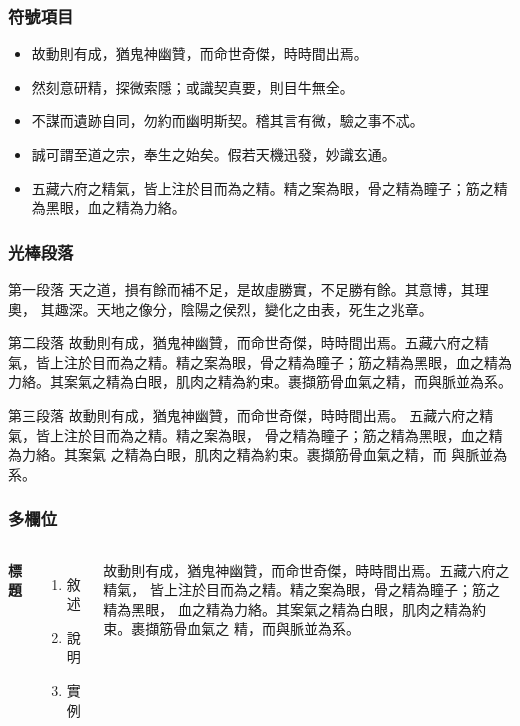 \documentclass[hyperref={bookmarks=false}]{beamer}
\begin{document}

\begin{frame}
\frametitle{\iyan 符號項目}
\begin{itemize}
\item 故動則有成，猶鬼神幽贊，而命世奇傑，時時間出焉。
\item 然刻意研精，探微索隱；或識契真要，則目牛無全。
\item 不謀而遺跡自同，勿約而幽明斯契。稽其言有微，驗之事不忒。
\item 誠可謂至道之宗，奉生之始矣。假若天機迅發，妙識玄通。
\item 五藏六府之精氣，皆上注於目而為之精。精之案為眼，骨之精為瞳子；筋之精為黑眼，血之精為力絡。
\end{itemize}
\end{frame}


\begin{frame}
\frametitle{\iyan 光棒段落}
\begin{block}{第一段落}
天之道，損有餘而補不足，是故虛勝實，不足勝有餘。其意博，其理奧，
其趣深。天地之像分，陰陽之侯烈，變化之由表，死生之兆章。
\end{block}

\begin{block}{第二段落}
故動則有成，猶鬼神幽贊，而命世奇傑，時時間出焉。五藏六府之精氣，皆上注於目而為之精。精之案為眼，骨之精為瞳子；筋之精為黑眼，血之精為力絡。其案氣之精為白眼，肌肉之精為約束。裹擷筋骨血氣之精，而與脈並為系。
\end{block}

\begin{block}{第三段落}
故動則有成，猶鬼神幽贊，而命世奇傑，時時間出焉。
五藏六府之精氣，皆上注於目而為之精。精之案為眼，
骨之精為瞳子；筋之精為黑眼，血之精為力絡。其案氣
之精為白眼，肌肉之精為約束。裹擷筋骨血氣之精，而
與脈並為系。
\end{block}
\end{frame}


\begin{frame}
\frametitle{\iyan 多欄位}
\begin{columns}[c] %

\textbf{標題}
\begin{enumerate}
\item 敘述
\item 說明
\item 實例
\end{enumerate}

故動則有成，猶鬼神幽贊，而命世奇傑，時時間出焉。五藏六府之精氣，
皆上注於目而為之精。精之案為眼，骨之精為瞳子；筋之精為黑眼，
血之精為力絡。其案氣之精為白眼，肌肉之精為約束。裹擷筋骨血氣之
精，而與脈並為系。

\end{columns}
\end{frame}
\end{document}
